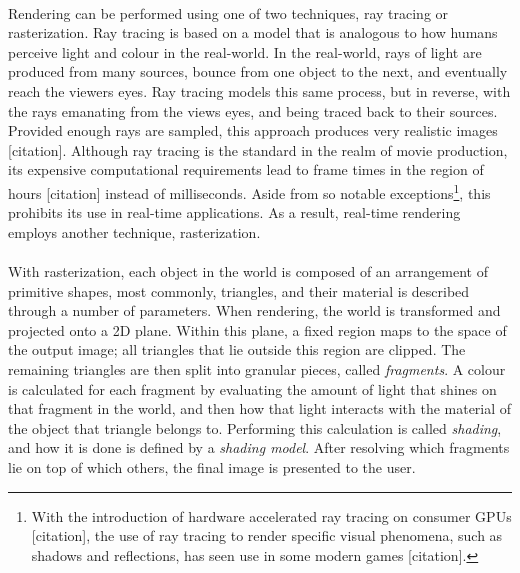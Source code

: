 \paragraph{}Rendering can be performed using one of two techniques, ray tracing or rasterization. Ray tracing is based on a model that is analogous to how humans perceive light and colour in the real-world. In the real-world, rays of light are produced from many sources, bounce from one object to the next, and eventually reach the viewers eyes. Ray tracing models this same process, but in reverse, with the rays emanating from the views eyes, and being traced back to their sources. Provided enough rays are sampled, this approach produces very realistic images [citation]. Although ray tracing is the standard in the realm of movie production, its expensive computational requirements lead to frame times in the region of hours [citation] instead of milliseconds. Aside from so notable exceptions\footnote{With the introduction of hardware accelerated ray tracing on consumer GPUs [citation], the use of ray tracing to render specific visual phenomena, such as shadows and reflections, has seen use in some modern games [citation].}, this prohibits its use in real-time applications. As a result, real-time rendering employs another technique, rasterization.

\paragraph{}With rasterization, each object in the world is composed of an arrangement of primitive shapes, most commonly, triangles, and their material is described through a number of parameters. When rendering, the world is transformed and projected onto a 2D plane. Within this plane, a fixed region maps to the space of the output image; all triangles that lie outside this region are clipped. The remaining triangles are then split into granular pieces, called \textit{fragments}. A colour is calculated for each fragment by evaluating the amount of light that shines on that fragment in the world, and then how that light interacts with the material of the object that triangle belongs to. Performing this calculation is called \textit{shading}, and how it is done is defined by a \textit{shading model}. After resolving which fragments lie on top of which others, the final image is presented to the user.

